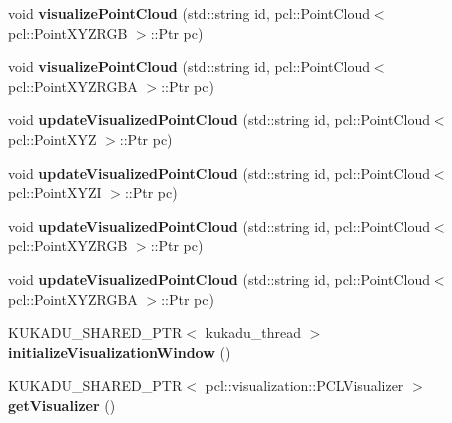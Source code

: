 \begin{DoxyCompactItemize}
\item 
void {\bfseries visualize\+Point\+Cloud} (std\+::string id, pcl\+::\+Point\+Cloud$<$ pcl\+::\+Point\+X\+Y\+Z\+R\+GB $>$\+::Ptr pc)\hypertarget{classkukadu_1_1PCLTools_a58bb832d31dc862dd7b9059d0f89dcda}{}\label{classkukadu_1_1PCLTools_a58bb832d31dc862dd7b9059d0f89dcda}

\item 
void {\bfseries visualize\+Point\+Cloud} (std\+::string id, pcl\+::\+Point\+Cloud$<$ pcl\+::\+Point\+X\+Y\+Z\+R\+G\+BA $>$\+::Ptr pc)\hypertarget{classkukadu_1_1PCLTools_a15816eaff6d57a5ae0249a2fe085d6a8}{}\label{classkukadu_1_1PCLTools_a15816eaff6d57a5ae0249a2fe085d6a8}

\item 
void {\bfseries update\+Visualized\+Point\+Cloud} (std\+::string id, pcl\+::\+Point\+Cloud$<$ pcl\+::\+Point\+X\+YZ $>$\+::Ptr pc)\hypertarget{classkukadu_1_1PCLTools_a1c66a201e0907c90081d8b8940277563}{}\label{classkukadu_1_1PCLTools_a1c66a201e0907c90081d8b8940277563}

\item 
void {\bfseries update\+Visualized\+Point\+Cloud} (std\+::string id, pcl\+::\+Point\+Cloud$<$ pcl\+::\+Point\+X\+Y\+ZI $>$\+::Ptr pc)\hypertarget{classkukadu_1_1PCLTools_acef2c2e3e90262fc2643ab3947dc799f}{}\label{classkukadu_1_1PCLTools_acef2c2e3e90262fc2643ab3947dc799f}

\item 
void {\bfseries update\+Visualized\+Point\+Cloud} (std\+::string id, pcl\+::\+Point\+Cloud$<$ pcl\+::\+Point\+X\+Y\+Z\+R\+GB $>$\+::Ptr pc)\hypertarget{classkukadu_1_1PCLTools_a4e8a0a75dd402884a04565e257d21cbf}{}\label{classkukadu_1_1PCLTools_a4e8a0a75dd402884a04565e257d21cbf}

\item 
void {\bfseries update\+Visualized\+Point\+Cloud} (std\+::string id, pcl\+::\+Point\+Cloud$<$ pcl\+::\+Point\+X\+Y\+Z\+R\+G\+BA $>$\+::Ptr pc)\hypertarget{classkukadu_1_1PCLTools_a15827a5f20d928f5cd2d4737af2c95c9}{}\label{classkukadu_1_1PCLTools_a15827a5f20d928f5cd2d4737af2c95c9}

\item 
K\+U\+K\+A\+D\+U\+\_\+\+S\+H\+A\+R\+E\+D\+\_\+\+P\+TR$<$ kukadu\+\_\+thread $>$ {\bfseries initialize\+Visualization\+Window} ()\hypertarget{classkukadu_1_1PCLTools_aa5b4944460518ddf14707c3cf5d2272b}{}\label{classkukadu_1_1PCLTools_aa5b4944460518ddf14707c3cf5d2272b}

\item 
K\+U\+K\+A\+D\+U\+\_\+\+S\+H\+A\+R\+E\+D\+\_\+\+P\+TR$<$ pcl\+::visualization\+::\+P\+C\+L\+Visualizer $>$ {\bfseries get\+Visualizer} ()\hypertarget{classkukadu_1_1PCLTools_a99abc0b66655b8511f519c2f42c740be}{}\label{classkukadu_1_1PCLTools_a99abc0b66655b8511f519c2f42c740be}

\end{DoxyCompactItemize}
